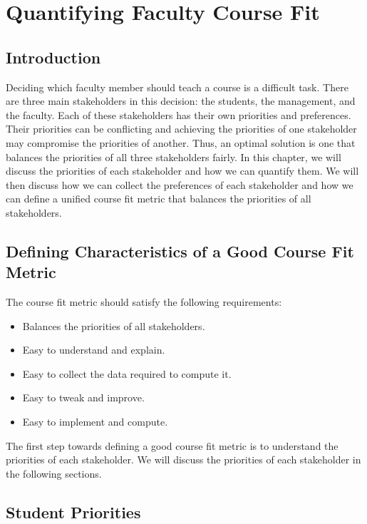 
\chapter{Quantifying Faculty Course Fit}

\section{Introduction}

Deciding which faculty member should teach a course is a difficult task. There are three main stakeholders in this decision: the students, the management, and the faculty. Each of these stakeholders has their own priorities and preferences. Their priorities can be conflicting and achieving the priorities of one stakeholder may compromise the priorities of another. Thus, an optimal solution is one that balances the priorities of all three stakeholders fairly. In this chapter, we will discuss the priorities of each stakeholder and how we can quantify them. We will then discuss how we can collect the preferences of each stakeholder and how we can define a unified course fit metric that balances the priorities of all stakeholders.


\section{Defining Characteristics of a Good Course Fit Metric}

The course fit metric should satisfy the following requirements:

\begin{itemize}

  \item {Balances the priorities of all stakeholders.}
  \item {Easy to understand and explain.}
  \item {Easy to collect the data required to compute it.}
  \item {Easy to tweak and improve.}
  \item {Easy to implement and compute.}

\end{itemize}

The first step towards defining a good course fit metric is to understand the priorities of each stakeholder. We will discuss the priorities of each stakeholder in the following sections.


\section{Student Priorities}


